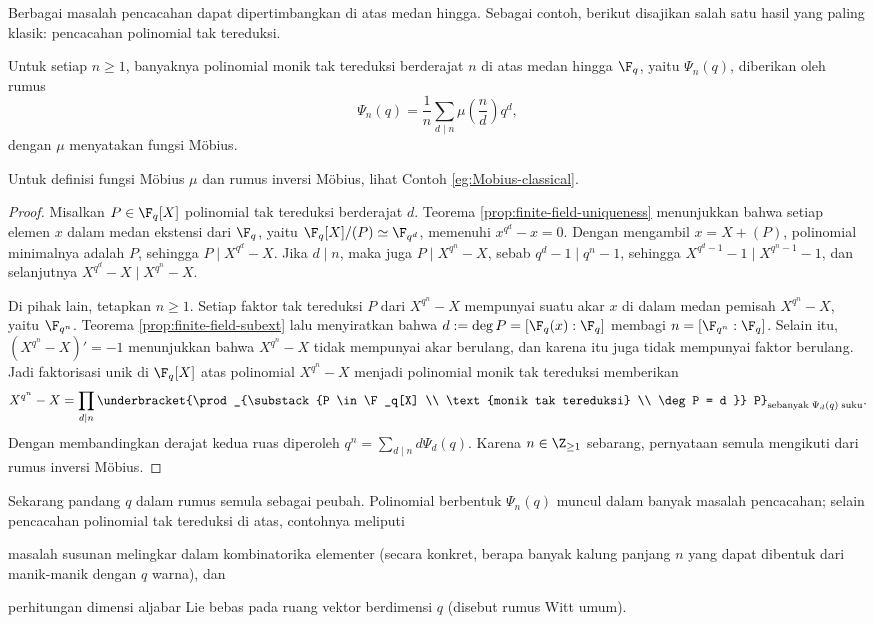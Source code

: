 Berbagai masalah pencacahan dapat dipertimbangkan di atas medan hingga. Sebagai contoh, berikut disajikan salah satu hasil yang paling klasik: pencacahan polinomial tak tereduksi.
\begin{proposition}[C.\ F.\ Gauss]
	Untuk setiap $n \geq 1$, banyaknya polinomial monik tak tereduksi berderajat $n$ di atas medan hingga $\F_q$, yaitu $\Psi_n(q)$, diberikan oleh rumus
	\[ \Psi_n(q) = \frac{1}{n} \sum_{d \mid n} \mu\left( \frac{n}{d}\right) q^d, \]
	dengan $\mu$ menyatakan fungsi Möbius.
\end{proposition}
Untuk definisi fungsi Möbius $\mu$ dan rumus inversi Möbius, lihat Contoh \ref{eg:Mobius-classical}.
\begin{proof}
	Misalkan $P \in \F_q[X]$ polinomial tak tereduksi berderajat $d$. Teorema \ref{prop:finite-field-uniqueness} menunjukkan bahwa setiap elemen $x$ dalam medan ekstensi dari $\F_q$, yaitu $\F_q[X]/(P) \simeq \F_{q^d}$, memenuhi $x^{q^d} - x = 0$. Dengan mengambil $x = X + (P)$, polinomial minimalnya adalah $P$, sehingga $P \mid X^{q^d} - X$. Jika $d \mid n$, maka juga $P \mid X^{q^n} - X$, sebab $q^d - 1 \mid q^n - 1$, sehingga $X^{q^d - 1} - 1 \mid X^{q^n - 1} - 1$, dan selanjutnya $X^{q^d} - X \mid X^{q^n} - X$.
	
	Di pihak lain, tetapkan $n \geq 1$. Setiap faktor tak tereduksi $P$ dari $X^{q^n} - X$ mempunyai suatu akar $x$ di dalam medan pemisah $X^{q^n}-X$, yaitu $\F_{q^n}$. Teorema \ref{prop:finite-field-subext} lalu menyiratkan bahwa $d := \deg P = [\F_q(x):\F_q]$ membagi $n = [\F_{q^n} : \F_q]$. Selain itu, $(X^{q^n}-X)' = -1$ menunjukkan bahwa $X^{q^n}-X$ tidak mempunyai akar berulang, dan karena itu juga tidak mempunyai faktor berulang. Jadi faktorisasi unik di $\F_q[X]$ atas polinomial $X^{q^n} - X$ menjadi polinomial monik tak tereduksi memberikan
	\[ X^{q^n}-X = \prod_{d \mid n} \underbracket{\prod_{\substack{P \in \F_q[X] \\ \text{monik tak tereduksi} \\ \deg P = d }} P}_{\text{sebanyak}\; \Psi_d(q) \;\text{suku}}. \]
	Dengan membandingkan derajat kedua ruas diperoleh $q^n=\sum_{d\mid n}d\Psi_d(q)$. Karena $n\in\Z_{\geq1}$ sebarang, pernyataan semula mengikuti dari rumus inversi Möbius.
\end{proof}

Sekarang pandang $q$ dalam rumus semula sebagai peubah. Polinomial berbentuk $\Psi_n(q)$ muncul dalam banyak masalah pencacahan; selain pencacahan polinomial tak tereduksi di atas, contohnya meliputi
\begin{inparaenum}[(a)]
	\item masalah susunan melingkar dalam kombinatorika elementer (secara konkret, berapa banyak kalung panjang $n$ yang dapat dibentuk dari manik-manik dengan $q$ warna), dan
	\item perhitungan dimensi aljabar Lie bebas pada ruang vektor berdimensi $q$ (disebut rumus Witt umum).
\end{inparaenum}

